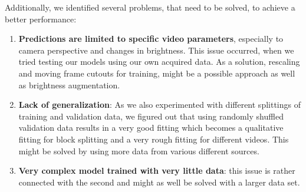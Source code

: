 \documentclass[conference]{IEEEtran}
\begin{document}
Additionally, we identified several problems, that need to be solved, to achieve a better performance:
\begin{enumerate}[label=(\roman*)]
	\item \textbf{Predictions are limited to specific video parameters}, especially to camera perspective and changes in brightness. This issue occurred, when we tried testing our models using our 
	own acquired data. As a solution, rescaling and moving frame cutouts for training, might be a possible approach as well as brightness augmentation.
	\item \textbf{Lack of generalization}: As we also experimented with different splittings of training and validation data, we figured out that using randomly shuffled validation data results in a 
	very good fitting which becomes a qualitative fitting for block splitting and a very rough fitting for different videos. This might be solved by using more data from various different sources.
	\item \textbf{Very complex model trained with very little data}: this issue is rather connected with the second and might as well be solved with a larger data set.
\end{enumerate}




\printbibliography
\end{document}
